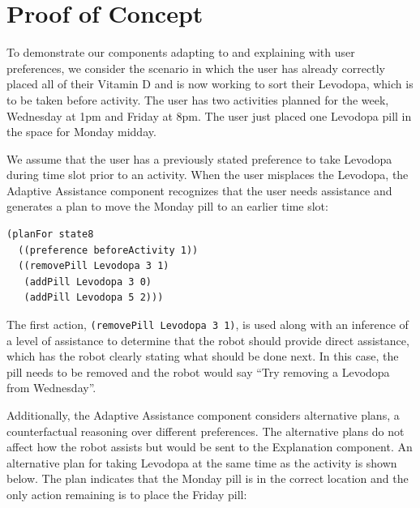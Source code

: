 \documentclass[letterpaper]{article} %
\begin{document}

\section{Proof of Concept}


To demonstrate our components adapting to and explaining with user preferences, we consider the scenario in which the user has already correctly placed all of their Vitamin D and is now working to sort their Levodopa, which is to be taken before activity.  The user has two activities planned for the week, Wednesday at 1pm and Friday at 8pm.  The user just placed one Levodopa pill in the space for Monday midday.

We assume that the user has a previously stated preference to take Levodopa during time slot prior to an activity.  When the user misplaces the Levodopa, the Adaptive Assistance component recognizes that the user needs assistance and generates a plan to
move the Monday pill to an earlier time slot:

\small{
\begin{verbatim}
(planFor state8
  ((preference beforeActivity 1))
  ((removePill Levodopa 3 1)
   (addPill Levodopa 3 0)
   (addPill Levodopa 5 2)))
\end{verbatim}}

The first action, \texttt{(removePill Levodopa 3 1)}, is used along with an inference of a level of assistance to determine that the robot should provide direct assistance, which has the robot clearly stating what should be done next.  In this case, the pill needs to be removed and the robot would say ``Try removing a Levodopa from Wednesday''.

Additionally, the Adaptive Assistance component considers alternative plans, a counterfactual reasoning over different preferences.  The alternative plans do not affect how the robot assists but would be sent to the Explanation component.  An alternative plan for taking Levodopa at the same time as the activity is shown below.
The plan indicates that the Monday pill is in the correct location and the only action remaining is to place the Friday pill:
\end{document}
